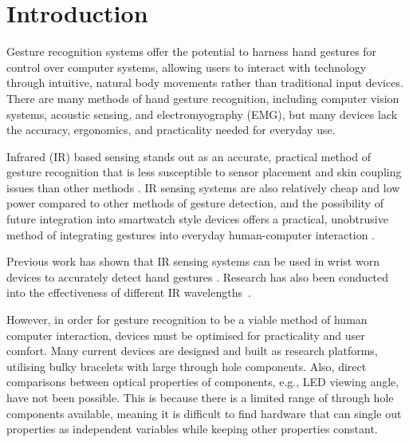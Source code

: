 \documentclass[ oneside,%
                    author={Jack Jarvis},
                    degree={BSc},
                     title={FlexIR: Flexible PCB Wristbands for Infrared Based Gesture Recognition},
                    unit={COMS30045},
                    subtitle={Investigating the Effect of LED Viewing Angle on Gesture Classification in Infrared Sensing Systems}]{dissertation}
\begin{document}

%

\mainmatter


\chapter{Introduction}
\label{chap:context}
Gesture recognition systems offer the potential to harness hand gestures for control over computer systems, allowing users to interact with technology through intuitive, natural body movements rather than traditional input devices. There are many methods of hand gesture recognition, including computer vision systems, acoustic sensing, and electromyography (EMG), but many devices lack the accuracy, ergonomics, and practicality needed for everyday use.

Infrared (IR) based sensing stands out as an accurate, practical method of gesture recognition that is less susceptible to sensor placement and skin coupling issues than other methods \cite{diamand2025}. IR sensing systems are also relatively cheap and low power compared to other methods of gesture detection, and the possibility of future integration into smartwatch style devices offers a practical, unobtrusive method of integrating gestures into everyday human-computer interaction \cite{McIntosh2017SensIR:Reflection}.

Previous work has shown that IR sensing systems can be used in wrist worn devices to accurately detect hand gestures \cite{McIntosh2017SensIR:Reflection} \cite{Khalikov2026WearableControl}. Research has also been conducted into the effectiveness of different IR wavelengths~\cite{diamand2025}. 

However, in order for gesture recognition to be a viable method of human computer interaction, devices must be optimised for practicality and user comfort. Many current devices are designed and built as research platforms, utilising bulky bracelets with large through hole components. Also, direct comparisons between optical properties of components, e.g., LED viewing angle, have not been possible. This is because there is a limited range of through hole components available, meaning it is difficult to find hardware that can single out properties as independent variables while keeping other properties constant.
\end{document}
